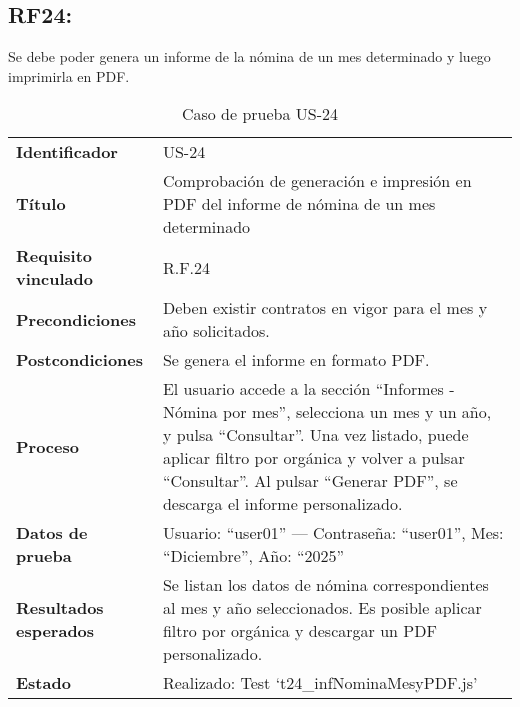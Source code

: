 \subsection*{RF24:} Se debe poder genera un informe de la nómina de un mes determinado y luego imprimirla en PDF.
\begin{table}[H]
	\centering
	\small
	\caption{Caso de prueba US-24}
	\label{tab:caso_uso24}
	\begin{tabular}{>{\bfseries}l p{11cm}}
		Identificador & US-24 \\
		Título & Comprobación de generación e impresión en PDF del informe de nómina de un mes determinado \\
		Requisito vinculado & R.F.24 \\
		Precondiciones & Deben existir contratos en vigor para el mes y año solicitados. \\
		Postcondiciones & Se genera el informe en formato PDF. \\
		Proceso & El usuario accede a la sección “Informes - Nómina por mes”, selecciona un mes y un año, y pulsa “Consultar”.  
		Una vez listado, puede aplicar filtro por orgánica y volver a pulsar “Consultar”.  
		Al pulsar “Generar PDF”, se descarga el informe personalizado. \\
		Datos de prueba & Usuario: “user01” — Contraseña: “user01”, Mes: “Diciembre”, Año: “2025” \\
		Resultados esperados & Se listan los datos de nómina correspondientes al mes y año seleccionados.  
		Es posible aplicar filtro por orgánica y descargar un PDF personalizado. \\
		Estado & Realizado: Test `t24\_infNominaMesyPDF.js' \\
	\end{tabular}
\end{table}

